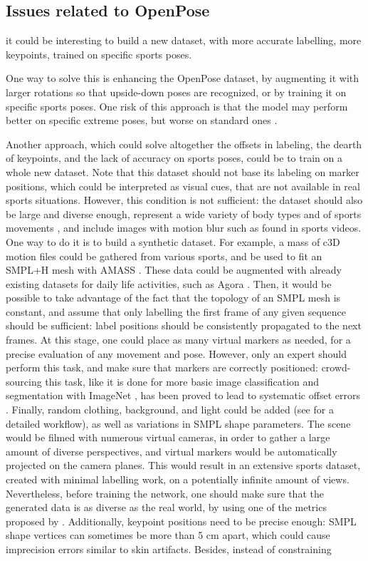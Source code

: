 \subsection{Issues related to OpenPose}

it could be interesting to build a new dataset, with more accurate labelling, more keypoints, trained on specific sports poses.

One way to solve this is enhancing the OpenPose dataset, by augmenting it with larger rotations so that upside-down poses are recognized, or by training it on specific sports poses. One risk of this approach is that the model may perform better on specific extreme poses, but worse on standard ones \cite{Kitamura2022}. 

Another approach, which could solve altogether the offsets in labeling, the dearth of keypoints, and the lack of accuracy on sports poses, could be to train on a whole new dataset. Note that this dataset should not base its labeling on marker positions, which could be interpreted as visual cues, that are not available in real sports situations. However, this condition is not sufficient: the dataset should also be large and diverse enough, represent a wide variety of body types and of sports movements \cite{Seethapathi2019}, and include images with motion blur such as found in sports videos. One way to do it is to build a synthetic dataset. For example, a mass of c3D motion files could be gathered from various sports, and be used to fit an SMPL+H mesh \cite{Pavlakos2019} with AMASS \cite{Mahmood2019}. These data could be augmented with already existing datasets for daily life activities, such as Agora \cite{Patel2021}. Then, it would be possible to take advantage of the fact that the topology of an SMPL mesh is constant, and assume that only labelling the first frame of any given sequence should be sufficient: label positions should be consistently propagated to the next frames. At this stage, one could place as many virtual markers as needed, for a precise evaluation of any movement and pose. However, only an expert should perform this task, and make sure that markers are correctly positioned: crowd-sourcing this task, like it is done for more basic image classification and segmentation with ImageNet \cite{Deng2009}, has been proved to lead to systematic offset errors \cite{Needham2021b}. Finally, random clothing, background, and light could be added (see \cite{Wood2021,Bolanos2021} for a detailed workflow), as well as variations in SMPL shape parameters. The scene would be filmed with numerous virtual cameras, in order to gather a large amount of diverse perspectives, and virtual markers would be automatically projected on the camera planes. This would result in an extensive sports dataset, created with minimal labelling work, on a potentially infinite amount of views. Nevertheless, before training the network, one should make sure that the generated data is as diverse as the real world, by using one of the metrics proposed by \cite{Borji2019, Borji2022}. Additionally, keypoint positions need to be precise enough: SMPL shape vertices can sometimes be more than 5 cm apart, which could cause imprecision errors similar to skin artifacts. Besides, instead of constraining 